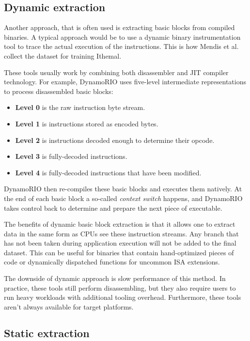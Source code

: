 \subsection{Dynamic extraction}

Another approach, that is often used is extracting basic blocks from compiled binaries. A typical 
approach would be to use a dynamic binary instrumentation tool to trace the actual execution of the 
instructions. This is how Mendis et al. collect the dataset for training 
Ithemal\cite{mendisIthemalAccuratePortable2019}.

These tools usually work by combining both disassembler and JIT compiler technology. For example, 
DynamoRIO uses five-level intermediate representations to process disassembled basic blocks:
\begin{itemize}
	\item \textbf{Level 0} is the raw instruction byte stream.
	\item \textbf{Level 1} is instructions stored as encoded bytes.
	\item \textbf{Level 2} is instructions decoded enough to determine their opcode.
	\item \textbf{Level 3} is fully-decoded instructions.
	\item \textbf{Level 4} is fully-decoded instructions that have been modified.
\end{itemize}
DynamoRIO then re-compiles these basic blocks and executes them natively. At the end of each basic 
block a so-called \textit{context switch} happens, and DynamoRIO takes control back to determine and 
prepare the next piece of executable.

The benefits of dynamic basic block extraction is that it allows one to extract data in the same form as 
CPUs see these instruction streams. Any branch that has not been taken during application execution 
will not be added to the final dataset. This can be useful for binaries that contain hand-optimized 
pieces of code or dynamically dispatched functions for uncommon ISA extensions.

The downside of dynamic approach is slow performance of this method. In practice, these tools still 
perform disassembling, but they also require users to run heavy workloads with additional tooling 
overhead. Furthermore, these tools aren't always available for target platforms.

\subsection{Static extraction}

